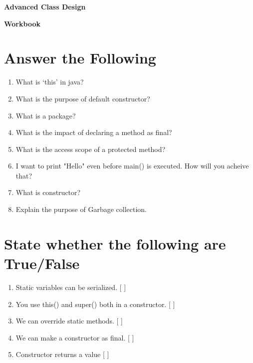 \documentclass[11pt,a4paper]{article}
\def\AnswerBox{\fbox{\begin{minipage}{4in}\hfill\vspace{0.5in}\end{minipage}}}
\begin{document}
\centerline{\huge{ \textbf{Advanced Class Design}}}

\vspace{1pc}

\centerline{\huge{ \textbf{ Workbook}}}

\section*{Answer the Following}
\begin{enumerate}\itemsep10pt

\item What is `this' in java?

\AnswerBox

\item  What is the purpose of default constructor?

\AnswerBox

\item What is a package?

    \AnswerBox

\item What is the impact of declaring a method as final?

    \AnswerBox

\item  What is the access scope of a protected method?

    \AnswerBox

\item I want to print "Hello" even before main() is executed. How will you acheive that?

    \AnswerBox

\item What is constructor?

    \AnswerBox

\item Explain the purpose of Garbage collection.

    \AnswerBox


   \end{enumerate}

  \section*{State whether the following are True/False}
  \begin{enumerate}\itemsep2pt
      \item Static variables can be serialized. [         ]
      \item You use this() and super() both in a constructor. [ ]
      \item We can override static methods. [ ]
      \item We can make a constructor as final. [ ]
      \item Constructor returns a value [ ]
      

  \end{enumerate}
\end{document}
